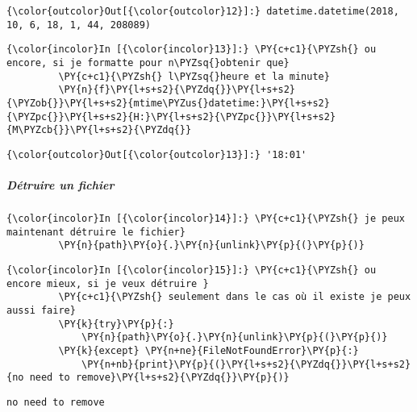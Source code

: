 \begin{Verbatim}[commandchars=\\\{\}]
{\color{outcolor}Out[{\color{outcolor}12}]:} datetime.datetime(2018, 10, 6, 18, 1, 44, 208089)
\end{Verbatim}
            
    \begin{Verbatim}[commandchars=\\\{\}]
{\color{incolor}In [{\color{incolor}13}]:} \PY{c+c1}{\PYZsh{} ou encore, si je formatte pour n\PYZsq{}obtenir que}
         \PY{c+c1}{\PYZsh{} l\PYZsq{}heure et la minute}
         \PY{n}{f}\PY{l+s+s2}{\PYZdq{}}\PY{l+s+s2}{\PYZob{}}\PY{l+s+s2}{mtime\PYZus{}datetime:}\PY{l+s+s2}{\PYZpc{}}\PY{l+s+s2}{H:}\PY{l+s+s2}{\PYZpc{}}\PY{l+s+s2}{M\PYZcb{}}\PY{l+s+s2}{\PYZdq{}}
\end{Verbatim}


\begin{Verbatim}[commandchars=\\\{\}]
{\color{outcolor}Out[{\color{outcolor}13}]:} '18:01'
\end{Verbatim}
            
    \hypertarget{duxe9truire-un-fichier}{%
\subparagraph{Détruire un fichier}\label{duxe9truire-un-fichier}}

    \begin{Verbatim}[commandchars=\\\{\}]
{\color{incolor}In [{\color{incolor}14}]:} \PY{c+c1}{\PYZsh{} je peux maintenant détruire le fichier}
         \PY{n}{path}\PY{o}{.}\PY{n}{unlink}\PY{p}{(}\PY{p}{)}
\end{Verbatim}


    \begin{Verbatim}[commandchars=\\\{\}]
{\color{incolor}In [{\color{incolor}15}]:} \PY{c+c1}{\PYZsh{} ou encore mieux, si je veux détruire }
         \PY{c+c1}{\PYZsh{} seulement dans le cas où il existe je peux aussi faire}
         \PY{k}{try}\PY{p}{:} 
             \PY{n}{path}\PY{o}{.}\PY{n}{unlink}\PY{p}{(}\PY{p}{)}
         \PY{k}{except} \PY{n+ne}{FileNotFoundError}\PY{p}{:}
             \PY{n+nb}{print}\PY{p}{(}\PY{l+s+s2}{\PYZdq{}}\PY{l+s+s2}{no need to remove}\PY{l+s+s2}{\PYZdq{}}\PY{p}{)}
\end{Verbatim}


    \begin{Verbatim}[commandchars=\\\{\}]
no need to remove

    \end{Verbatim}

